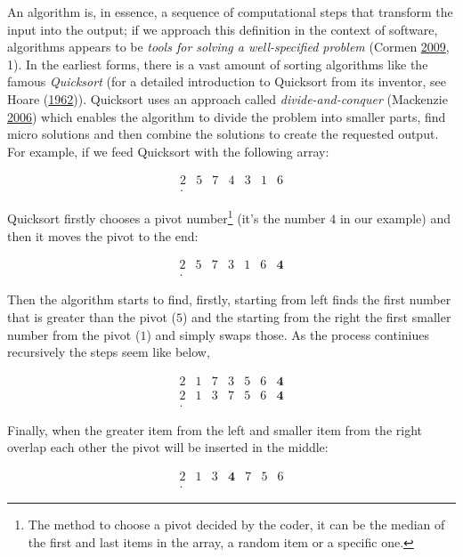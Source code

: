 \documentclass[12pt,twoside]{report}
\let\rmarkdownfootnote\footnote%
\def\footnote{\protect\rmarkdownfootnote}
\begin{document}
An algorithm is, in essence, a sequence of computational steps that transform the input into the output; if we approach this definition in the context of software, algorithms appears to be \emph{tools for solving a well-specified problem} (Cormen \protect\hyperlink{ref-Cormen2009}{2009}, 1). In the earliest forms, there is a vast amount of sorting algorithms like the famous \emph{Quicksort} (for a detailed introduction to Quicksort from its inventor, see Hoare (\protect\hyperlink{ref-Hoare1962}{1962})). Quicksort uses an approach called \emph{divide-and-conquer} (Mackenzie \protect\hyperlink{ref-Mackenzie2006}{2006}) which enables the algorithm to divide the problem into smaller parts, find micro solutions and then combine the solutions to create the requested output. For example, if we feed Quicksort with the following array:

\[\begin{array}{ccccccc}
 2 & 5 & 7 & 4 & 3 & 1 & 6\\
.
\end{array}\]

Quicksort firstly chooses a pivot number\footnote{The method to choose a pivot decided by the coder, it can be the median of the first and last items in the array, a random item or a specific one.} (it's the number \(4\) in our example) and then it moves the pivot to the end:

\[\begin{array}{ccccccc}
 2 & 5 & 7 & 3 & 1 & 6 & \textbf{4}\\
.
\end{array}\]

Then the algorithm starts to find, firstly, starting from left finds the first number that is greater than the pivot (\(5\)) and the starting from the right the first smaller number from the pivot (\(1\)) and simply swaps those. As the process continiues recursively the steps seem like below,

\[\begin{array}{ccccccc}
 2 & 1 & 7 & 3 & 5 & 6 & \textbf{4} \\
 2 & 1 & 3 & 7 & 5 & 6 & \textbf{4} \\
.
\end{array}\]

Finally, when the greater item from the left and smaller item from the right overlap each other the pivot will be inserted in the middle:

\[\begin{array}{ccccccc}
 2 & 1 & 3 & \textbf{4} & 7 & 5 & 6 \\
.
\end{array}\]
\end{document}

